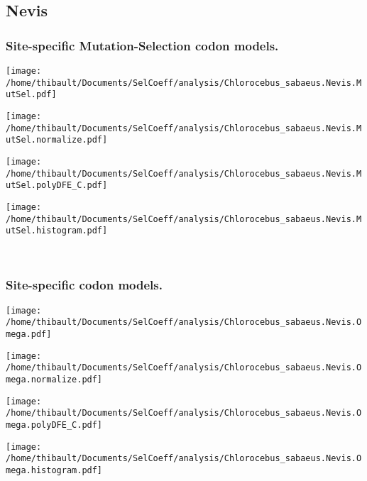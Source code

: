 \subsection{Nevis} 
 
\subsubsection*{Site-specific Mutation-Selection codon models.} 
\begin{minipage}{0.49\linewidth} 
\texttt{[image: /home/thibault/Documents/SelCoeff/analysis/Chlorocebus\_sabaeus.Nevis.MutSel.pdf]} 
\end{minipage}
\begin{minipage}{0.49\linewidth} 
\texttt{[image: /home/thibault/Documents/SelCoeff/analysis/Chlorocebus\_sabaeus.Nevis.MutSel.normalize.pdf]} 
\end{minipage}
\begin{minipage}{0.49\linewidth} 
\texttt{[image: /home/thibault/Documents/SelCoeff/analysis/Chlorocebus\_sabaeus.Nevis.MutSel.polyDFE\_C.pdf]} 
\end{minipage}
\begin{minipage}{0.49\linewidth} 
\texttt{[image: /home/thibault/Documents/SelCoeff/analysis/Chlorocebus\_sabaeus.Nevis.MutSel.histogram.pdf]} 
\end{minipage}
\\ 
\subsubsection*{Site-specific codon models.} 
\begin{minipage}{0.49\linewidth} 
\texttt{[image: /home/thibault/Documents/SelCoeff/analysis/Chlorocebus\_sabaeus.Nevis.Omega.pdf]} 
\end{minipage}
\begin{minipage}{0.49\linewidth} 
\texttt{[image: /home/thibault/Documents/SelCoeff/analysis/Chlorocebus\_sabaeus.Nevis.Omega.normalize.pdf]} 
\end{minipage}
\begin{minipage}{0.49\linewidth} 
\texttt{[image: /home/thibault/Documents/SelCoeff/analysis/Chlorocebus\_sabaeus.Nevis.Omega.polyDFE\_C.pdf]} 
\end{minipage}
\begin{minipage}{0.49\linewidth} 
\texttt{[image: /home/thibault/Documents/SelCoeff/analysis/Chlorocebus\_sabaeus.Nevis.Omega.histogram.pdf]} 
\end{minipage}
\\ 
